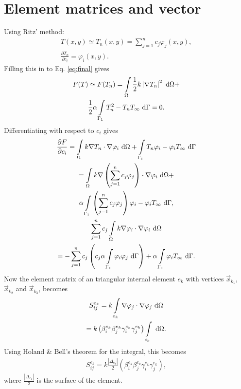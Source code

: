 \section{Element matrices and vector}
Using Ritz' method: 
\begin{gather*}
    T(x,y) \simeq T_n(x,y)=\sum_{j=1}^n c_j\varphi_j(x,y),\\
    \frac{\partial T_n}{\partial c_i}=\varphi_i(x,y).
\end{gather*} Filling this in to Eq. \ref{eq:final} gives
\begin{gather*}
    F(T)\simeq F(T_n) = \int\displaylimits_{\Omega}\frac{1}{2} k \left|\nabla T_n\right|^2~\text{d}\Omega + \\ \frac{1}{2}\alpha\int\displaylimits_{\Gamma_1}T_n^2-T_nT_{\infty}~\text{d}\Gamma = 0.
\end{gather*} Differentiating with respect to $c_i$ gives
\begin{gather*}
    \frac{\partial F}{\partial c_i} = \int\displaylimits_{\Omega}k\nabla T_n\cdot\nabla\varphi_i~\text{d}\Omega    +\int\displaylimits_{\Gamma_1}T_n\varphi_i-\varphi_iT_{\infty}~\text{d}\Gamma\\
    = \int\displaylimits_{\Omega}k\nabla\left(\sum_{j=1}^n c_j \varphi_j\right)\cdot \nabla \varphi_i~\text{d}\Omega + \\ \alpha\int\displaylimits_{\Gamma_1} \left(\sum_{j=1}^n c_j \varphi_j\right)\varphi_i - \varphi_i T_{\infty}~\text{d}\Gamma,\\
    \sum_{j=1}^n c_j \int\displaylimits_{\Omega}k\nabla\varphi_i\cdot \nabla \varphi_i~\text{d}\Omega \\
    = - \sum_{j=1}^n c_j\left(c_j\alpha\int\displaylimits_{\Gamma_1} \varphi_i \varphi_j~\text{d}\Gamma \right)+\alpha\int\displaylimits_{\Gamma_1}\varphi_i T_{\infty}~\text{d}\Gamma.
\end{gather*} Now the element matrix of an triangular internal element $e_k$ with vertices $\vec{x}_{k_1}$, $\vec{x}_{k_2}$ and $\vec{x}_{k_3}$, becomes
\begin{gather*}
    S_{ij}^{e_k} =  k\int\displaylimits_{e_k} \nabla \varphi_j \cdot \nabla \varphi_j~\text{d}\Omega \\
    = k\left(\beta_i^{e_k} \beta_j^{e_k} \gamma_i^{e_k} \gamma_j^{e_k} \right)\int\displaylimits_{e_k}~\text{d}\Omega.
\end{gather*} Using Holand \& Bell's theorem for the integral, this becomes
\begin{gather}
    S_{ij}^{e_k} = k \frac{|\Delta_{e_k}|}{2}\left(\beta_i^{e_k} \beta_j^{e_k} \gamma_i^{e_k} \gamma_j^{e_k} \right),
\end{gather} where $\frac{|\Delta_{e_k}|}{2}$ is the surface of the element.

